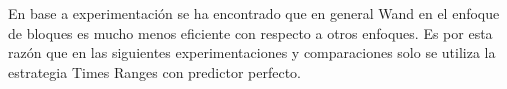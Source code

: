 
En base a experimentación se ha encontrado que en general Wand en el enfoque de bloques es mucho menos eficiente con respecto a otros enfoques. Es por esta razón que en las siguientes experimentaciones y comparaciones solo se utiliza la estrategia Times Ranges con predictor perfecto. 












